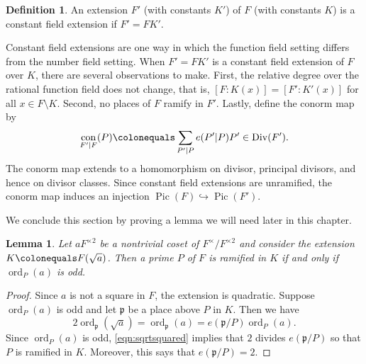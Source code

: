 \documentclass{dcthesis}
\newcommand{\defi}[1]{\textsf{#1}}
\DeclareMathOperator{\con}{con}
\DeclareMathOperator{\Div}{Div}
\DeclareMathOperator{\Pic}{Pic}
\DeclareMathOperator{\ord}{ord}
\numberwithin{equation}{section}
\newtheorem{lemma}[equation]{Lemma}
\theoremstyle{definition}
\newtheorem{definition}[equation]{Definition}
\theoremstyle{remark}
\begin{document}
{{{    \begin{definition}
      \label{def:constantfieldextension}
      An extension $F'$ (with constants $K'$)
      of $F$ (with constants $K$)
      is a \defi{constant field extension}
      if $F'= FK'$.
    \end{definition}
    Constant field extensions are one way in
    which the function field setting differs
    from the number field setting.
    When $F'=FK'$ is a constant field extension
    of $F$ over $K$, there are
    several observations to make.
    First, the relative degree over
    the rational function field does not change,
    that is,
    $[F:K(x)] = [F':K'(x)]$ for
    all $x\in F\setminus K$.
    Second,
    no places of $F$ ramify in $F'$.
    Lastly,
    define the \defi{conorm map} by
    \begin{equation}
      \label{eqn:conorm}
      \con_{F'|F}(P)
      \colonequals\sum_{P'|P}e(P'|P)P'\in\Div(F').
    \end{equation}
    The conorm map extends to a homomorphism
    on divisor, principal divisors,
    and hence on divisor classes.
    Since constant field extensions
    are unramified,
    the conorm map
    induces an injection
    $\Pic(F)\hookrightarrow\Pic(F')$.
    \par
    We conclude this section by proving a
    lemma we will need later in this chapter.
    \begin{lemma}
      \label{lem:kummerramification}
      Let $aF^{\times 2}$ be a nontrivial
      coset of $F^\times/F^{\times 2}$
      and consider the extension
      $K\colonequals F(\sqrt{a})$.
      Then a prime $P$ of $F$ is ramified
      in $K$ if and only if
      $\ord_P(a)$ is odd.
    \end{lemma}
    \begin{proof}
      Since $a$ is not a square in $F$,
      the extension is quadratic.
      Suppose $\ord_P(a)$ is odd
      and let $\mathfrak{p}$ be
      a place above $P$ in $K$.
      Then we have
      \begin{equation}
        \label{eqn:sqrtsquared}
        2\ord_{\mathfrak{p}}(\sqrt{a})
        = \ord_{\mathfrak{p}}(a)
        = e(\mathfrak{p}/P)\ord_P(a).
      \end{equation}
      Since $\ord_P(a)$ is odd,
      \eqref{eqn:sqrtsquared}
      implies that $2$ divides
      $e(\mathfrak{p}/P)$ so that
      $P$ is ramified in $K$.
      Moreover, this says that
      $e(\mathfrak{p}/P) = 2$.
      \par

\end{proof}}}}
\end{document}
